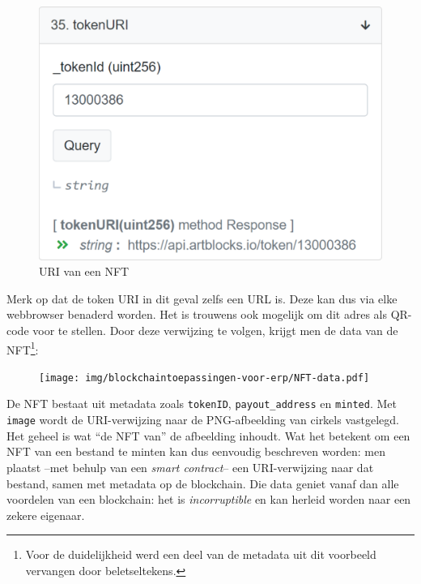 \begin{figure}[H]
	\centering
	\includegraphics[width=0.5\linewidth]{img/blockchaintoepassingen-voor-erp/nft-tokenURI.png}
	\caption{\label{fig:nft-tokenURI}URI van een NFT}
\end{figure}

Merk op dat de token URI in dit geval zelfs een URL is. Deze kan dus via elke webbrowser benaderd worden. Het is trouwens ook mogelijk om dit adres als QR-code voor te stellen. Door deze verwijzing te volgen, krijgt men de data van de NFT\footnote{Voor de duidelijkheid werd een deel van de metadata uit dit voorbeeld vervangen door beletseltekens.}:

\begin{figure}[H]
	\centering
	\texttt{[image: img/blockchaintoepassingen-voor-erp/NFT-data.pdf]}
\end{figure}

De NFT bestaat uit metadata zoals \verb|tokenID|, \verb*|payout_address| en \verb|minted|. Met \verb*|image| wordt de URI-verwijzing naar de PNG-afbeelding van cirkels vastgelegd. Het geheel is wat ``de NFT van'' de afbeelding inhoudt. 
Wat het betekent om een NFT van een bestand te minten kan dus eenvoudig beschreven worden: men plaatst --met behulp van een \textit{smart contract}-- een URI-verwijzing naar dat bestand, samen met metadata op de blockchain. Die data geniet vanaf dan alle voordelen van een blockchain: het is \textit{incorruptible} en kan herleid worden naar een zekere eigenaar.
